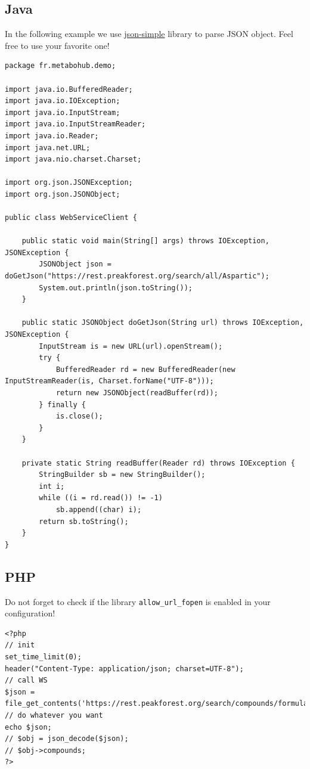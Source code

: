 \subsection{Java}
\hspace*{\parindent}
In the following example we use \href{https://code.google.com/p/json-simple/}{json-simple} library to parse JSON object. 
Feel free to use your favorite one!

\begin{lstlisting}[language=customJava,caption={Java request}]
package fr.metabohub.demo;

import java.io.BufferedReader;
import java.io.IOException;
import java.io.InputStream;
import java.io.InputStreamReader;
import java.io.Reader;
import java.net.URL;
import java.nio.charset.Charset;

import org.json.JSONException;
import org.json.JSONObject;

public class WebServiceClient {

	public static void main(String[] args) throws IOException, JSONException {
		JSONObject json = doGetJson("https://rest.preakforest.org/search/all/Aspartic");
		System.out.println(json.toString());
	}

	public static JSONObject doGetJson(String url) throws IOException, JSONException {
		InputStream is = new URL(url).openStream();
		try {
			BufferedReader rd = new BufferedReader(new InputStreamReader(is, Charset.forName("UTF-8")));
			return new JSONObject(readBuffer(rd));
		} finally {
			is.close();
		}
	}

	private static String readBuffer(Reader rd) throws IOException {
		StringBuilder sb = new StringBuilder();
		int i;
		while ((i = rd.read()) != -1)
			sb.append((char) i);
		return sb.toString();
	}
}
\end{lstlisting}

\subsection{PHP}
\hspace*{\parindent}
Do not forget to check if the library \texttt{allow\_url\_fopen} is enabled in your configuration!
\begin{lstlisting}[language=customPHP,caption={PHP request}]
<?php
// init
set_time_limit(0);
header("Content-Type: application/json; charset=UTF-8");
// call WS
$json = file_get_contents('https://rest.peakforest.org/search/compounds/formula/C26H43NO6');
// do whatever you want
echo $json;
// $obj = json_decode($json);
// $obj->compounds;
?>
\end{lstlisting}

